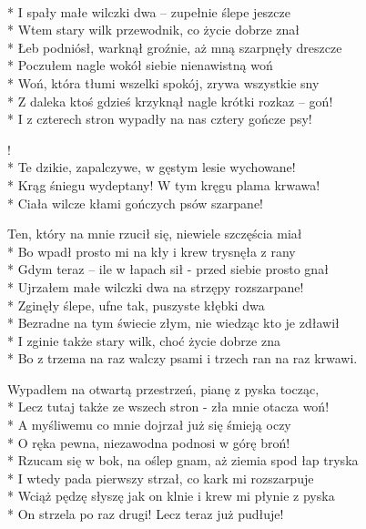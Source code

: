 \begin{lyrics}[longestline={Bo z trzema na raz walczy psami i trzech ran na raz krwawi.}]

\\*
I spały małe wilczki dwa -- zupełnie ślepe jeszcze\\*
Wtem stary wilk przewodnik, co życie dobrze znał\\*
Łeb podniósł, warknął groźnie, aż mną szarpnęły dreszcze\\*
Poczułem nagle wokół siebie nienawistną woń\\*
Woń, która tłumi wszelki spokój, zrywa wszystkie sny\\*
Z daleka ktoś gdzieś krzyknął nagle krótki rozkaz -- goń!\\*
I z czterech stron wypadły na nas cztery gończe psy!

\begin{chorus}
!\\*
Te dzikie, zapalczywe, w gęstym lesie wychowane!\\*
Krąg śniegu wydeptany! W tym kręgu plama krwawa!\\*
Ciała wilcze kłami gończych psów szarpane!
\end{chorus}

Ten, który na mnie rzucił się, niewiele szczęścia miał\\*
Bo wpadł prosto mi na kły i krew trysnęła z rany\\*
Gdym teraz -- ile w łapach sił - przed siebie prosto gnał\\*
Ujrzałem małe wilczki dwa na strzępy rozszarpane!\\*
Zginęły ślepe, ufne tak, puszyste kłębki dwa\\*
Bezradne na tym świecie złym, nie wiedząc kto je zdławił\\*
I zginie także stary wilk, choć życie dobrze zna\\*
Bo z trzema na raz walczy psami i trzech ran na raz krwawi.

\chorusref

\breaklyrics

Wypadłem na otwartą przestrzeń, pianę z pyska tocząc,\\*
Lecz tutaj także ze wszech stron - zła mnie otacza woń!\\*
A myśliwemu co mnie dojrzał już się śmieją oczy\\*
O ręka pewna, niezawodna podnosi w górę broń!\\*
Rzucam się w bok, na oślep gnam, aż ziemia spod łap tryska\\*
I wtedy pada pierwszy strzał, co kark mi rozszarpuje\\*
Wciąż pędzę słyszę jak on klnie i krew mi płynie z pyska\\*
On strzela po raz drugi! Lecz teraz już pudłuje!


\end{lyrics}
